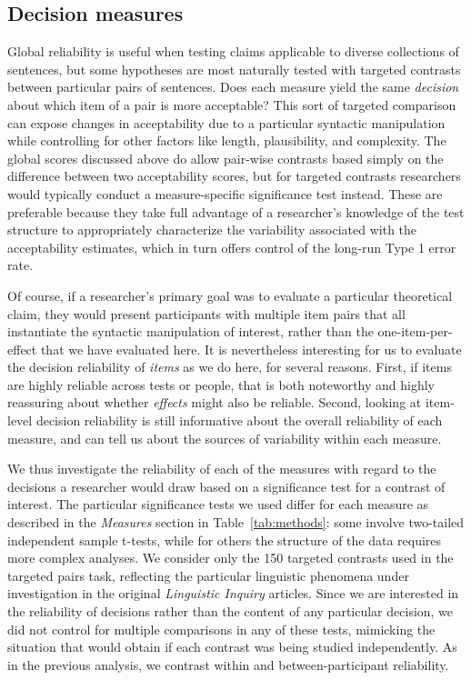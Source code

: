 \documentclass[doc]{apa6}
\begin{document}
\subsection{Decision measures}

Global reliability is useful when testing claims applicable to diverse collections of sentences, but some hypotheses are most naturally tested with targeted contrasts between particular pairs of sentences. Does each measure yield the same {\it decision} about which item of a pair is more acceptable? This sort of targeted comparison can expose changes in acceptability due to a particular syntactic manipulation while controlling for other factors like length, plausibility, and complexity. The global scores discussed above do allow pair-wise contrasts based simply on the difference between two acceptability scores, but for targeted contrasts researchers would typically conduct a measure-specific significance test instead. These are preferable because they take full advantage of a researcher's knowledge of the test structure to appropriately characterize the variability associated with the acceptability estimates, which in turn offers control of the long-run Type 1 error rate.

Of course, if a researcher's primary goal was to evaluate a particular theoretical claim, they would present participants with multiple item pairs that all instantiate the syntactic manipulation of interest, rather than the one-item-per-effect that we have evaluated here. It is nevertheless interesting for us to evaluate the decision reliability of {\it items} as we do here, for several reasons. First, if items are highly reliable across tests or people, that is both noteworthy and highly reassuring about whether {\it effects} might also be reliable. Second, looking at item-level decision reliability is still informative about the overall reliability of each measure, and can tell us about the sources of variability within each measure.

We thus investigate the reliability of each of the measures with regard to the decisions a researcher would draw based on a significance test for a contrast of interest.
The particular significance tests we used differ for each measure as described in the {\it Measures} section in Table~\ref{tab:methods}: some involve two-tailed independent sample t-tests, while for others the structure of the data requires more complex analyses. We consider only the 150 targeted contrasts used in the targeted pairs task, reflecting the particular linguistic phenomena under investigation in the original {\it Linguistic Inquiry} articles. Since we are interested in the reliability of decisions rather than the content of any particular decision, we did not control for multiple comparisons in any of these tests, mimicking the situation that would obtain if each contrast was being studied independently. As in the previous analysis, we contrast within and between-participant reliability.
\end{document}
